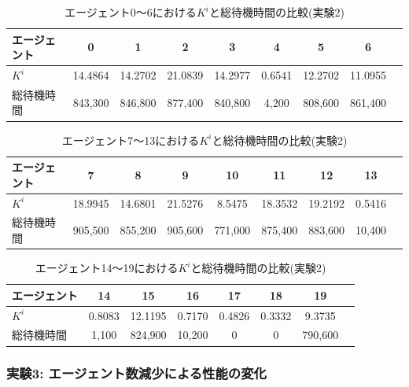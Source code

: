 \documentclass[12pt,a4j,twoside]{jarticle}
\begin{document}
  \begin{table}
    \centering
    \caption{エージェント0～6における$K^i$と総待機時間の比較(実験2)}
    \begin{tabular}{lcccccccr}\\ \hline
      エージェント & 0 & 1 & 2 & 3 & 4 & 5 & 6 \\ \hline
      $K^i$ & 14.4864 & 14.2702 & 21.0839 & 14.2977 & 0.6541 & 12.2702 & 11.0955 \\ \hline
      総待機時間 & 843,300 & 846,800 & 877,400 & 840,800 & 4,200 & 808,600 & 861,400 \\ \hline      
    \end{tabular}
    \label{tb:ER_Complex_k1}
  \end{table}

  \begin{table}
    \centering
    \caption{エージェント7～13における$K^i$と総待機時間の比較(実験2)}
    \begin{tabular}{lcccccccr}\\ \hline
      エージェント & 7 & 8 & 9 & 10 & 11 & 12 & 13 \\ \hline
      $K^i$  & 18.9945 & 14.6801 & 21.5276 & 8.5475 & 18.3532 & 19.2192 & 0.5416 \\ \hline
      総待機時間 & 905,500 & 855,200 & 905,600 & 771,000 & 875,400 & 883,600 & 10,400 \\ \hline      
    \end{tabular}
    \label{tb:ER_Complex_k2}
  \end{table}

  \begin{table}
    \centering
    \caption{エージェント14～19における$K^i$と総待機時間の比較(実験2)}
    \begin{tabular}{lccccccr}\\ \hline
      エージェント & 14 & 15 & 16 & 17 & 18 & 19 \\ \hline
      $K^i$  & 0.8083 & 12.1195 & 0.7170 & 0.4826 & 0.3332 & 9.3735 \\ \hline
      総待機時間 & 1,100 & 824,900 & 10,200 & 0 & 0 & 790,600 \\ \hline
    \end{tabular}
    \label{tb:ER_Complex_k3}
  \end{table}

  \subsubsection{実験3: エージェント数減少による性能の変化}
\end{document}
